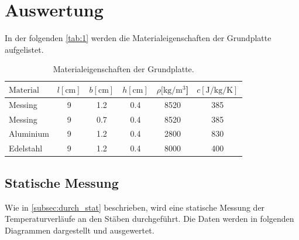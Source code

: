 \section{Auswertung}
\label{sec:Auswertung}
In der folgenden \autoref{tab:1} werden die Materialeigenschaften der Grundplatte aufgelistet.
\begin{table}[H]
  \centering
  \caption{Materialeigenschaften der Grundplatte. \cite{V204}}
  \label{tab:1}
  \begin{tabular}{l S S S S S }
    \toprule
    {$\text{Material}$} & {$l [\si{\centi\meter}]$} & {$b [ \si{\centi\metre}]$} & {$h[\si{\centi\metre}]$} & {$\rho [\si{\kilo\gram\per\metre\tothe{3}}$]} & {$c [\si{\joule\per\kilo\gram\per\kelvin}]$} \\
    \midrule
    Messing  & 9 & 1.2 & 0.4 & 8520 & 385 \\
    Messing  & 9 & 0.7 & 0.4 & 8520 & 385 \\
    Aluminium  & 9 & 1.2 & 0.4 & 2800 & 830 \\
    Edelstahl  & 9 & 1.2 & 0.4 & 8000 & 400 \\
    \bottomrule
  \end{tabular}
\end{table}


\subsection{Statische Messung}
\label{subsec:aus_stat}
Wie in \autoref{subsec:durch_stat} beschrieben, wird eine statische Messung der Temperaturverläufe an den Stäben durchgeführt. 
Die Daten werden in folgenden Diagrammen dargestellt und ausgewertet.

